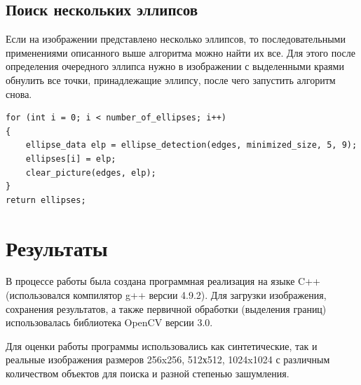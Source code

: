 \subsection{Поиск нескольких эллипсов}

Если на изображении представлено несколько эллипсов, то последовательными применениями описанного выше алгоритма можно найти их все. 
Для этого после определения очередного эллипса нужно в изображении с выделенными краями обнулить все точки, принадлежащие эллипсу, после чего запустить алгоритм снова.

\begin{lstlisting}
for (int i = 0; i < number_of_ellipses; i++)
{
    ellipse_data elp = ellipse_detection(edges, minimized_size, 5, 9);
    ellipses[i] = elp;
    clear_picture(edges, elp);
}
return ellipses;
\end{lstlisting}

\section{Результаты}
В процессе работы была создана программная реализация на языке C++ (использовался компилятор g++ версии 4.9.2). 
Для загрузки изображения, сохранения результатов, а также первичной обработки (выделения границ) использовалась библиотека OpenCV версии 3.0.

Для оценки работы программы использовались как синтетические, так и реальные изображения размеров 256x256, 512х512, 1024x1024 с различным количеством объектов для поиска и разной степенью зашумления.

